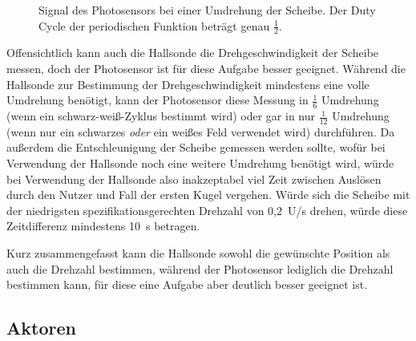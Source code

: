 \documentclass{kis}
\begin{document}
\begin{figure}
	\centering
	
	\caption[Signal des Photosensors bei einer Umdrehung der Scheibe.]{Signal des Photosensors bei einer Umdrehung der Scheibe. Der Duty Cycle der periodischen Funktion beträgt genau $\frac{1}{2}$.}
	\label{fig:photosensor}
\end{figure}

Offensichtlich kann auch die Hallsonde die Drehgeschwindigkeit der Scheibe messen, doch der Photosensor ist für diese Aufgabe besser geeignet. Während die Hallsonde zur Bestimmung der Drehgeschwindigkeit mindestens eine volle Umdrehung benötigt, kann der Photosensor diese Messung in $\frac{1}{6}$ Umdrehung (wenn ein schwarz-weiß-Zyklus bestimmt wird) oder gar in nur $\frac{1}{12}$ Umdrehung (wenn nur ein schwarzes \emph{oder} ein weißes Feld verwendet wird) durchführen. Da außerdem die Entschleunigung der Scheibe gemessen werden sollte, wofür bei Verwendung der Hallsonde noch eine weitere Umdrehung benötigt wird, würde bei Verwendung der Hallsonde also inakzeptabel viel Zeit zwischen Auslösen durch den Nutzer und Fall der ersten Kugel vergehen. Würde sich die Scheibe mit der niedrigsten spezifikationsgerechten Drehzahl von 0,2~U/s drehen, würde diese Zeitdifferenz mindestens 10~s betragen.

Kurz zusammengefasst kann die Hallsonde sowohl die gewünschte Position als auch die Drehzahl bestimmen, während der Photosensor lediglich die Drehzahl bestimmen kann, für diese eine Aufgabe aber deutlich besser geeignet ist.

\clearpage
\subsection{Aktoren}
\end{document}
